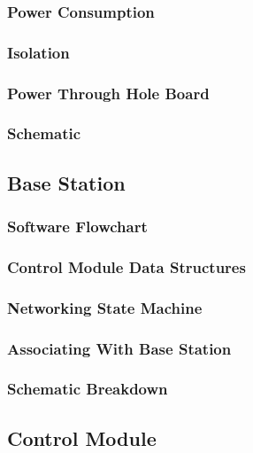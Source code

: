 \subsubsection{Power Consumption}

\subsubsection{Isolation}

\subsubsection{Power Through Hole Board}

\subsubsection{Schematic}

\subsection{Base Station}

\subsubsection{Software Flowchart}

\subsubsection{Control Module Data Structures}

\subsubsection{Networking State Machine}

\subsubsection{Associating With Base Station}

\subsubsection{Schematic Breakdown}

\subsection{Control Module}

